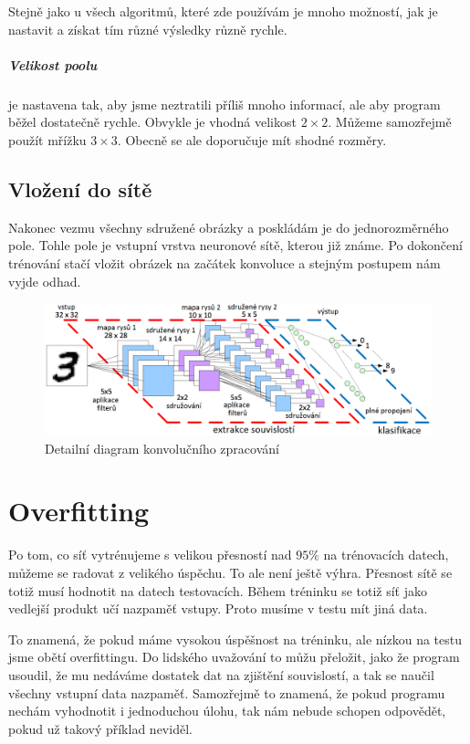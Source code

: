 \documentclass[12pt,a4paper]{report}
\begin{document}
Stejně jako u všech algoritmů, které zde používám je mnoho možností, jak je nastavit a získat tím různé výsledky různě rychle.
\paragraph{Velikost poolu}
je nastavena tak, aby jsme neztratili příliš mnoho informací, ale aby program běžel dostatečně rychle. Obvykle je vhodná velikost $2\times2$. Můžeme samozřejmě použít mřížku $3\times3$. Obecně se ale doporučuje mít shodné rozměry.
\section{Vložení do sítě}
Nakonec vezmu všechny sdružené obrázky a poskládám je do jednorozměrného pole. Tohle pole je vstupní vrstva neuronové sítě, kterou již známe. Po dokončení trénování stačí vložit obrázek na začátek konvoluce a stejným postupem nám vyjde odhad.

\begin{figure}[h]
	\centering
	\includegraphics[width=17cm]{images/convolution}
	\caption{Detailní diagram konvolučního zpracování \cite{kernix}}
\end{figure}

\chapter{Overfitting}
Po tom, co síť vytrénujeme s velikou přesností nad $95\%$ na trénovacích datech, můžeme se radovat z velikého úspěchu. To ale není ještě výhra. Přesnost sítě se totiž musí hodnotit na datech testovacích. Během tréninku se totiž síť jako vedlejší produkt učí nazpaměť vstupy. Proto musíme v testu mít jiná data.

To znamená, že pokud máme vysokou úspěšnost na tréninku, ale nízkou na testu jsme obětí overfittingu. Do lidského uvažování to můžu přeložit, jako že program usoudil, že mu nedáváme dostatek dat na zjištění souvislostí, a tak se naučil všechny vstupní data nazpaměť. Samozřejmě to znamená, že pokud programu nechám vyhodnotit i jednoduchou úlohu, tak nám nebude schopen odpovědět, pokud už takový příklad neviděl.
\end{document}

